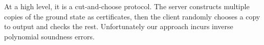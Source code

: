 


At a high level, it is a cut-and-choose protocol.
The server constructs multiple copies of the ground state as certificates,
then the client randomly chooses a copy to output and checks the rest.
Unfortunately our approach incurs inverse polynomial soundness errors.


